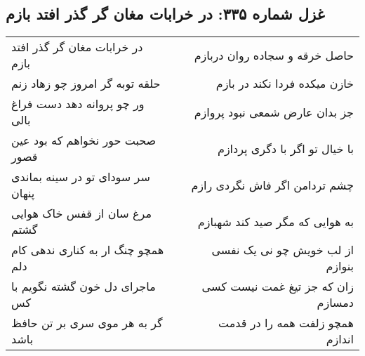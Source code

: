 \begin{center}
\section*{غزل شماره ۳۳۵: در خرابات مغان گر گذر افتد بازم}
\label{sec:sh335}
\begin{longtable}{l p{0.5cm} r}
در خرابات مغان گر گذر افتد بازم
&&
حاصل خرقه و سجاده روان دربازم
\\
حلقه توبه گر امروز چو زهاد زنم
&&
خازن میکده فردا نکند در بازم
\\
ور چو پروانه دهد دست فراغ بالی
&&
جز بدان عارض شمعی نبود پروازم
\\
صحبت حور نخواهم که بود عین قصور
&&
با خیال تو اگر با دگری پردازم
\\
سر سودای تو در سینه بماندی پنهان
&&
چشم تردامن اگر فاش نگردی رازم
\\
مرغ سان از قفس خاک هوایی گشتم
&&
به هوایی که مگر صید کند شهبازم
\\
همچو چنگ ار به کناری ندهی کام دلم
&&
از لب خویش چو نی یک نفسی بنوازم
\\
ماجرای دل خون گشته نگویم با کس
&&
زان که جز تیغ غمت نیست کسی دمسازم
\\
گر به هر موی سری بر تن حافظ باشد
&&
همچو زلفت همه را در قدمت اندازم
\\
\end{longtable}
\end{center}
